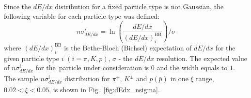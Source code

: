 \noindent Since the $dE/dx$ distribution for a fixed particle type
is not Gaussian, the following variable for each particle type was defined:
\begin{equation}
n\sigma^i_{dE/dx}=\ln\left(\frac{dE/dx}{(dE/dx)_i^\textrm{{BB}}}\right)/\sigma
\label{eq:nsigma}
\end{equation}
where $(dE/dx)_i^\textrm{{BB}}$ is the Bethe-Bloch (Bichsel) expectation
of $dE/dx$ for the given particle type $i$ $(i =
\pi, K, p)$, $\sigma$ - the $dE/dx$ resolution.
The expected value of $n\sigma^i_{dE/dx}$ for the~particle under consideration is  $0$  and the width equals to $1$. The sample $n\sigma^i_{dE/dx}$ distribution for $\pi^{\pm}$, $K^\pm$ and $p(\bar{p})$ in one $\xi$ range, $0.02 < \xi < 0.05$, is shown  in Fig.~\ref{fig:dEdx_nsigma}.
\begin{figure}[h!]
	

\end{figure}
